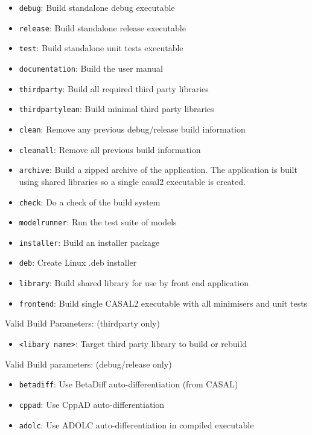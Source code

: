 \begin{itemize}
  \item \texttt{debug}:  Build standalone debug executable
  \item \texttt{release}: Build standalone release executable
  \item \texttt{test}: Build standalone unit tests executable
  \item \texttt{documentation}: Build the user manual
  \item \texttt{thirdparty}: Build all required third party libraries
  \item \texttt{thirdpartylean}: Build minimal third party libraries
  \item \texttt{clean}: Remove any previous debug/release build information
  \item \texttt{cleanall}: Remove all previous build information
  \item \texttt{archive}: Build a zipped archive of the application. The application is built using shared libraries so a single casal2 executable is created. 
  \item \texttt{check}: Do a check of the build system
  \item \texttt{modelrunner}: Run the test suite of models
  \item \texttt{installer}: Build an installer package
  \item \texttt{deb}: Create Linux .deb installer
  \item \texttt{library}: Build shared library for use by front end application
  \item \texttt{frontend}: Build single CASAL2 executable with all minimisers and unit tests
\end{itemize}

Valid Build Parameters: (thirdparty only)
\begin{itemize}
  \item \texttt{<libary name>}: Target third party library to build or rebuild
\end{itemize}

Valid Build parameters: (debug/release only)
\begin{itemize}
  \item \texttt{betadiff}: Use BetaDiff auto-differentiation (from CASAL)
  \item \texttt{cppad}: Use CppAD auto-differentiation
  \item \texttt{adolc}: Use ADOLC auto-differentiation in compiled executable
\end{itemize}

